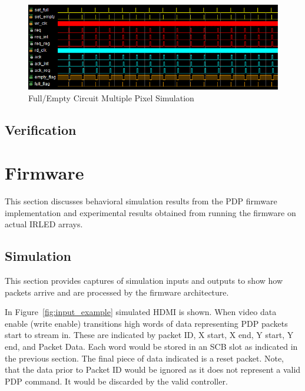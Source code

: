         \begin{figure}[t]
            \centering
            \includegraphics[width=1.0\textwidth]{fig/full_empty_row_sim.png}
            \caption{Full/Empty Circuit Multiple Pixel Simulation}
            \label{fig:full_empty_row_sim}
        \end{figure}

    \subsection{Verification}

%

\section{Firmware}
    This section discusses behavioral simulation results from the PDP firmware implementation and experimental results obtained from running the firmware on actual IRLED arrays.

    \subsection{Simulation}
    This section provides captures of simulation inputs and outputs to show how packets arrive and are processed by the firmware architecture.

    In Figure~\ref{fig:input_example} simulated HDMI is shown. When video data enable (write enable) transitions high words of data representing PDP packets start to stream in. These are indicated by packet ID, X start, X end, Y start, Y end, and Packet Data. Each word would be stored in an SCB slot as indicated in the previous section. The final piece of data indicated is a reset packet. Note, that the data prior to Packet ID would be ignored as it does not represent a valid PDP command. It would be discarded by the valid controller.

